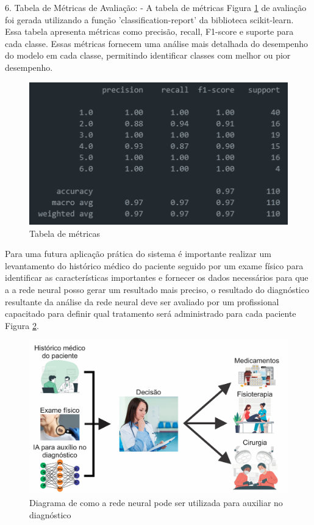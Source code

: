 \documentclass[conference]{IEEEtran}
\begin{document}
6. Tabela de Métricas de Avaliação:
   - A tabela de métricas Figura \ref{fig:metricas} de avaliação foi gerada utilizando a função 'classification-report' da biblioteca scikit-learn. Essa tabela apresenta métricas como precisão, recall, F1-score e suporte para cada classe. Essas métricas fornecem uma análise mais detalhada do desempenho do modelo em cada classe, permitindo identificar classes com melhor ou pior desempenho.

\begin{figure}[htbp]
    \centerline{\includegraphics[width = 1.0\linewidth]{./figuras/figura7.png}}
    \caption{Tabela de métricas}
    \label{fig:metricas}
\end{figure}

Para uma futura aplicação prática do sistema é importante realizar um levantamento do histórico médico do paciente seguido por um exame físico para identificar as características importantes e fornecer os dados necessários para que a a rede neural posso gerar um resultado mais preciso, o resultado do diagnóstico resultante da análise da rede neural deve ser avaliado por um profissional capacitado para definir qual tratamento será administrado para cada paciente Figura \ref{fig:diagrama}.

\begin{figure}[htbp]
    \centerline{\includegraphics[width = 1.0\linewidth]{./figuras/figura 8.jpg}}
    \caption{Diagrama de como a rede neural pode ser utilizada para auxiliar no diagnóstico}
    \label{fig:diagrama}
\end{figure}
\end{document}
